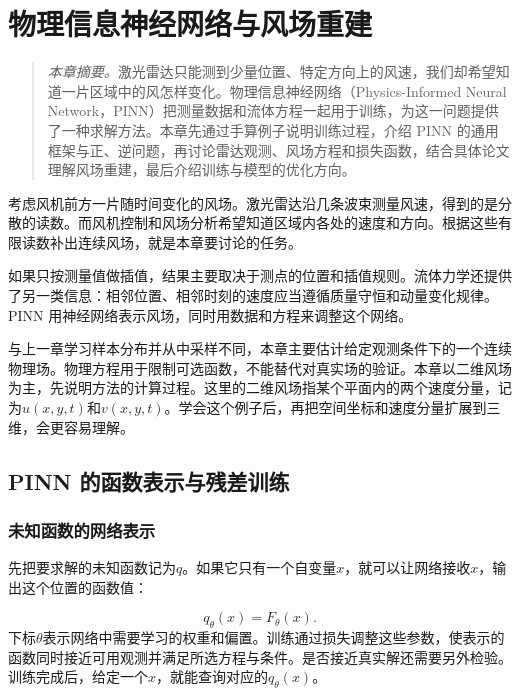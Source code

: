 \chapter{物理信息神经网络与风场重建}
\label{chap:pinn}
\begin{quote}\small
\textit{本章摘要。}激光雷达只能测到少量位置、特定方向上的风速，我们却希望知道一片区域中的风怎样变化。物理信息神经网络（Physics-Informed Neural Network，PINN）把测量数据和流体方程一起用于训练，为这一问题提供了一种求解方法。本章先通过手算例子说明训练过程，介绍 PINN 的通用框架与正、逆问题，再讨论雷达观测、风场方程和损失函数，结合具体论文理解风场重建，最后介绍训练与模型的优化方向。
\end{quote}

考虑风机前方一片随时间变化的风场。激光雷达沿几条波束测量风速，得到的是分散的读数。而风机控制和风场分析希望知道区域内各处的速度和方向。根据这些有限读数补出连续风场，就是本章要讨论的任务。

如果只按测量值做插值，结果主要取决于测点的位置和插值规则。流体力学还提供了另一类信息：相邻位置、相邻时刻的速度应当遵循质量守恒和动量变化规律。PINN 用神经网络表示风场，同时用数据和方程来调整这个网络\cite{karniadakis2021physics, raissi2019pinn}。

与上一章学习样本分布并从中采样不同，本章主要估计给定观测条件下的一个连续物理场。物理方程用于限制可选函数，不能替代对真实场的验证。本章以二维风场为主，先说明方法的计算过程。这里的二维风场指某个平面内的两个速度分量，记为$u(x,y,t)$和$v(x,y,t)$。学会这个例子后，再把空间坐标和速度分量扩展到三维，会更容易理解。

\section{PINN 的函数表示与残差训练}
\label{sec:pinn-formulation}

\subsection{未知函数的网络表示}
先把要求解的未知函数记为$q$。如果它只有一个自变量$x$，就可以让网络接收$x$，输出这个位置的函数值：

\begin{equation}
 q_\theta(x)=F_\theta(x).
 \label{eq:pinn-generic-network}
\end{equation}
下标$\theta$表示网络中需要学习的权重和偏置。训练通过损失调整这些参数，使表示的函数同时接近可用观测并满足所选方程与条件。是否接近真实解还需要另外检验。训练完成后，给定一个$x$，就能查询对应的$q_\theta(x)$。


